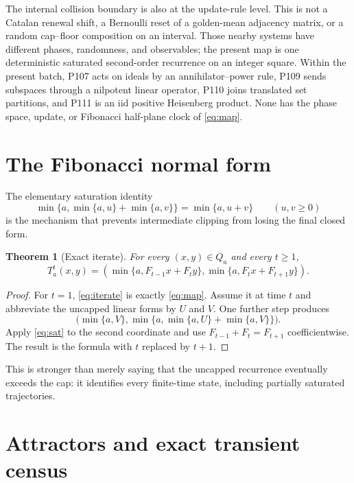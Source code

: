 \documentclass[11pt,a4paper]{amsart}
\newtheorem{theorem}{Theorem}[section]
\begin{document}
The internal collision boundary is also at the update-rule level.  This is
not a Catalan renewal shift, a Bernoulli reset of a golden-mean adjacency
matrix, or a random cap--floor composition on an interval.  Those nearby
systems have different phases, randomness, and observables; the present map
is one deterministic saturated second-order recurrence on an integer square.
Within the present batch, P107 acts on ideals by an
annihilator--power rule, P109 sends subspaces through a nilpotent linear
operator, P110 joins translated set partitions, and P111 is an iid positive
Heisenberg product.  None has the phase space, update, or Fibonacci
half-plane clock of \eqref{eq:map}.

\section{The Fibonacci normal form}

The elementary saturation identity
\begin{equation}
 \label{eq:sat}
 \min\{a,\min\{a,u\}+\min\{a,v\}\}=\min\{a,u+v\}
 \qquad(u,v\geq0)
\end{equation}
is the mechanism that prevents intermediate clipping from losing the final
closed form.

\begin{theorem}[Exact iterate]
\label{thm:iterate}
For every $(x,y)\in Q_a$ and every $t\geq1$,
\begin{equation}
 \label{eq:iterate}
 T_a^t(x,y)=
 \left(
 \min\{a,F_{t-1}x+F_ty\},
 \min\{a,F_tx+F_{t+1}y\}
 \right).
\end{equation}
\end{theorem}

\begin{proof}
For $t=1$, \eqref{eq:iterate} is exactly \eqref{eq:map}.  Assume it at time
$t$ and abbreviate the uncapped linear forms by $U$ and $V$.  One further
step produces
\[
 \bigl(\min\{a,V\},
 \min\{a,\min\{a,U\}+\min\{a,V\}\}\bigr).
\]
Apply \eqref{eq:sat} to the second coordinate and use
$F_{t-1}+F_t=F_{t+1}$ coefficientwise.  The result is the formula with
$t$ replaced by $t+1$.
\end{proof}

This is stronger than merely saying that the uncapped recurrence eventually
exceeds the cap: it identifies every finite-time state, including partially
saturated trajectories.

\section{Attractors and exact transient census}
\end{document}
